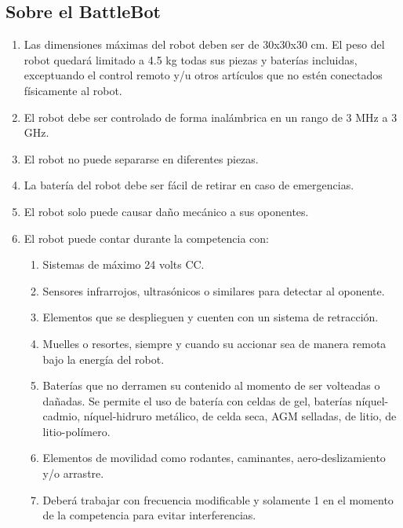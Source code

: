 \documentclass[11pt]{article}
\begin{document}
\subsection{Sobre el BattleBot}\label{subs:bt}
\begin{enumerate}
    \item Las dimensiones máximas del robot deben ser de 30x30x30 cm. El peso del robot quedará limitado a 4.5 kg todas sus piezas y baterías incluidas, exceptuando el control remoto y/u otros artículos que no estén conectados físicamente al robot.
    \item El robot debe ser controlado de forma inalámbrica en un rango de 3 MHz a 3 GHz.
    \item El robot no puede separarse en diferentes piezas.
    \item La batería del robot debe ser fácil de retirar en caso de emergencias. %
    \item El robot solo puede causar daño mecánico a sus oponentes.
    \item El robot puede contar durante la competencia con: 
    \begin{enumerate}
        \item Sistemas de máximo 24 volts CC.
        \item Sensores infrarrojos, ultrasónicos o similares para detectar al oponente.
        \item Elementos que se desplieguen y cuenten con un sistema de retracción.
        \item Muelles o resortes, siempre y cuando su accionar sea de manera remota bajo la energía del robot.
        \item Baterías que no derramen su contenido al momento de ser volteadas o dañadas. Se permite el uso de batería con celdas de gel, baterías níquel-cadmio, níquel-hidruro metálico, de celda seca, AGM selladas, de litio, de litio-polímero.
        \item Elementos de movilidad como rodantes, caminantes, aero-deslizamiento y/o arrastre.
        \item Deberá trabajar con frecuencia modificable y solamente 1 en el momento de la competencia para evitar interferencias.
    \end{enumerate}
    

\end{enumerate}
\end{document}
